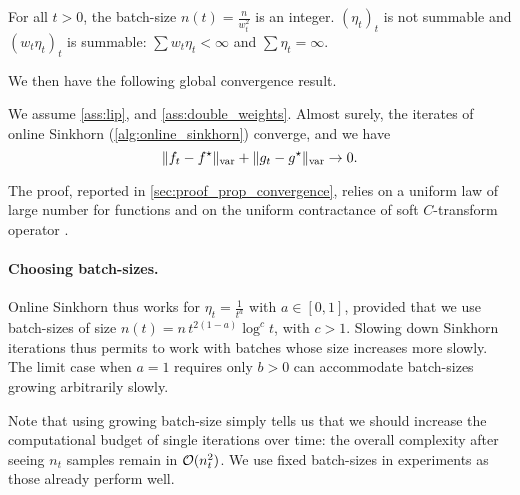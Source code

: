 \begin{assumption}\label{ass:double_weights}
    For all $t > 0$, the batch-size $n(t) = \frac{n}{w_t^2}$ is an integer. ${(\eta_t)}_t$ is
    not summable and ${(w_t \eta_t)}_t$ is summable: $\sum w_t \eta_t <
    \infty$ and $\sum \eta_t = \infty$.
\end{assumption}
We then have the following global convergence result.

\begin{proposition}\label{prop:convergence_true}
    We assume \autoref{ass:lip}, and
    \ref{ass:double_weights}. Almost surely, the iterates of online Sinkhorn
    (\autoref{alg:online_sinkhorn}) converge, and we have
    \begin{equation}
        \Vert f_t - f^\star \Vert_{\text{\upshape var}} + \Vert g_t - g^\star \Vert_{\text{\upshape var}} \to 0.
    \end{equation}
\end{proposition}

The proof, reported in \autoref{sec:proof_prop_convergence}, relies on a uniform law of large number for functions \citep[][chapter 19]{van_der_vaart_asymptotic_2000} and on the uniform contractance of soft $C$-transform operator \citep[e.g.][Proposition 19]{vialard2019elementary}.

\paragraph{Choosing batch-sizes.}

Online Sinkhorn thus works for $\eta_t = \frac{1}{t^a}$ with $a \in [0, 1]$,
provided that we use batch-sizes of size $n(t) = n\, t^{2(1-a)} \log^c t$, with $c >
1$. Slowing down Sinkhorn iterations thus permits to work with batches whose
size increases more slowly. The limit case when $a = 1$ requires only $b > 0$
can accommodate batch-sizes growing arbitrarily slowly. 

Note that using growing batch-size simply tells us that we should increase the
computational budget of single iterations over time: the overall complexity
after seeing $n_t$ samples remain in $\mathcal{O}(n_t^2)$. We use fixed batch-sizes in
experiments as those already perform well.